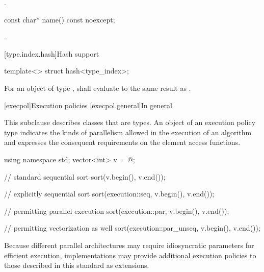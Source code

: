 \begin{itemdescr}
\pnum
\returns {}.
\end{itemdescr}

%
\begin{itemdecl}
const char* name() const noexcept;
\end{itemdecl}

\begin{itemdescr}
\pnum
\returns {}.
\end{itemdescr}

[type.index.hash]{Hash support}

%
\begin{itemdecl}
template<> struct hash<type_index>;
\end{itemdecl}

\begin{itemdescr}
\pnum
For an object  of type ,
 shall evaluate to the same result as .
\end{itemdescr}

[execpol]{Execution policies}
[execpol.general]{In general}

\pnum
This subclause describes classes that are  types. An
object of an execution policy type indicates the kinds of parallelism allowed
in the execution of an algorithm and expresses the consequent requirements on
the element access functions.
\begin{example}
\begin{codeblock}
using namespace std;
vector<int> v = @\commentellip@;

// standard sequential sort
sort(v.begin(), v.end());

// explicitly sequential sort
sort(execution::seq, v.begin(), v.end());

// permitting parallel execution
sort(execution::par, v.begin(), v.end());

// permitting vectorization as well
sort(execution::par_unseq, v.begin(), v.end());
\end{codeblock}
\end{example}
\begin{note}
Because different parallel architectures may require idiosyncratic
parameters for efficient execution, implementations
may provide additional execution policies to those described in this
standard as extensions.
\end{note}

